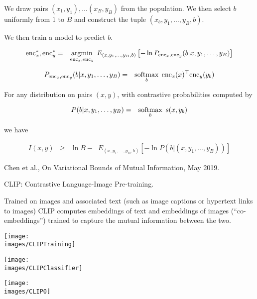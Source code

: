 {

We draw pairs $(x_1,y_1), \ldots (x_B,y_B)$ from the population.
We then select $b$ uniformly from $1$ to $B$ and construct the tuple $(x_b,y_1,\ldots,y_B,b)$.

\vfill
We then train a model to predict $b$.
\vfill
{\huge
\begin{eqnarray*}
\mathrm{enc}_x^*,\mathrm{enc}_y^* & = & \operatorname*{argmin}_{\mathrm{enc}_x,\mathrm{enc}_y} \;E_{(x,y_1,\ldots,y_B,b)}\left[-\ln P_{\mathrm{enc}_x,\mathrm{enc}_y}(b|x,y_1,\ldots,y_B)\right]
\end{eqnarray*}

\begin{eqnarray*}
P_{\mathrm{enc}_x,\mathrm{enc}_y}(b|x,y_1,\ldots,y_B) & = & \operatorname*{softmax}_b\; \mathrm{enc}_x(x)^\top\mathrm{enc}_y(y_b)
\end{eqnarray*}
}


For any distribution on pairs $(x,y)$, with contrastive probabilities computed by

\begin{eqnarray*}
P(b|x,y_1,\ldots,y_B) & = & \operatorname*{softmax}_b\;s(x,y_b)
\end{eqnarray*}

we have

{\huge
\begin{eqnarray*}
I(x,y) & \geq & \ln B - \;\;E_{(x,y_1,\ldots,y_B,b)}\left[-\ln P(b|(x,y_1,\ldots,y_B))\right]
\end{eqnarray*}
}

Chen et al., On Variational Bounds of Mutual Information, May 2019.


CLIP: Contrastive Language-Image Pre-training.

\vfill
Trained on images and associated text (such as image captions or hypertext links to images) CLIP computes embeddings of text and embeddings of images
(``co-embeddings'') trained to capture the mutual information between the two.


\centerline{\texttt{[image: \\images/CLIPTraining]}}


\centerline{\texttt{[image: \\images/CLIPClassifier]}}


\centerline{\texttt{[image: \\images/CLIP0]}}

}
